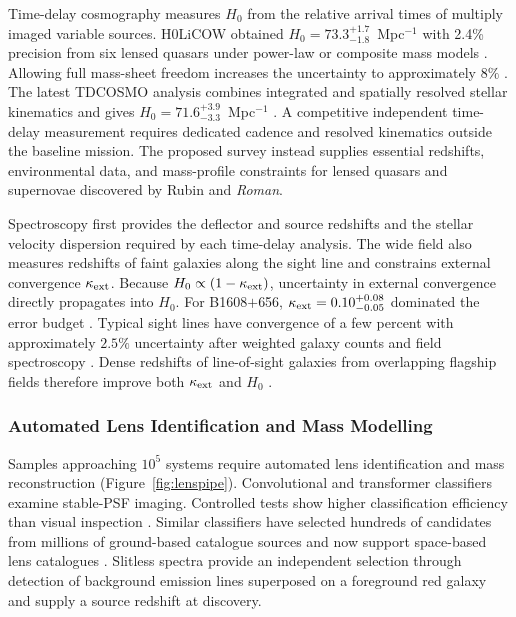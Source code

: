 Time-delay cosmography measures $H_0$ from the relative arrival times of multiply imaged variable sources. H0LiCOW obtained $H_0=73.3^{+1.7}_{-1.8}$ \kms\,Mpc$^{-1}$ with 2.4\% precision from six lensed quasars under power-law or composite mass models \cite{wong2020}. Allowing full mass-sheet freedom increases the uncertainty to approximately $8\%$ \cite{birrer2020}. The latest TDCOSMO analysis combines integrated and spatially resolved stellar kinematics and gives $H_0=71.6^{+3.9}_{-3.3}$ \kms\,Mpc$^{-1}$ \cite{birrer2025}. A competitive independent time-delay measurement requires dedicated cadence and resolved kinematics outside the baseline mission. The proposed survey instead supplies essential redshifts, environmental data, and mass-profile constraints for lensed quasars and supernovae discovered by Rubin and \textit{Roman}.

Spectroscopy first provides the deflector and source redshifts and the stellar velocity dispersion required by each time-delay analysis. The wide field also measures redshifts of faint galaxies along the sight line and constrains external convergence $\kappa_{\rm ext}$. Because $H_0\propto(1-\kappa_{\rm ext})$, uncertainty in external convergence directly propagates into $H_0$. For B1608$+$656, $\kappa_{\rm ext}=0.10^{+0.08}_{-0.05}$ dominated the error budget \cite{suyu2010}. Typical sight lines have convergence of a few percent with approximately $2.5\%$ uncertainty after weighted galaxy counts and field spectroscopy \cite{rusu2017,wells2023}. Dense redshifts of line-of-sight galaxies from overlapping flagship fields therefore improve both $\kappa_{\rm ext}$ and $H_0$ \cite{greene2013}.

\subsubsection{Automated Lens Identification and Mass Modelling}

Samples approaching $10^5$ systems require automated lens identification and mass reconstruction (Figure~\ref{fig:lenspipe}). Convolutional and transformer classifiers examine stable-PSF imaging. Controlled tests show higher classification efficiency than visual inspection \cite{metcalf2019}. Similar classifiers have selected hundreds of candidates from millions of ground-based catalogue sources \cite{jacobs2019} and now support space-based lens catalogues \cite{walmsley2025}. Slitless spectra provide an independent selection through detection of background emission lines superposed on a foreground red galaxy and supply a source redshift at discovery.

